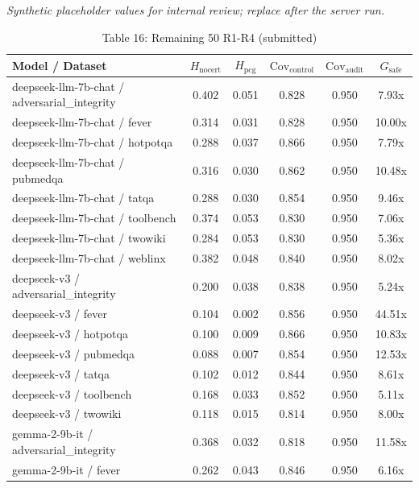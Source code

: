 

\begin{table}[h]
\centering
\small
  \textit{Synthetic placeholder values for internal review; replace after the server run.}
\caption{Table 16: Remaining 50 R1-R4 (submitted)}
\label{tab:appendix_remaining_50_r1r4_old}
\begin{tabular}{l|cc|cc|c}
\hline
Model / Dataset & $H_{\mathrm{nocert}}$ & $H_{\mathrm{pcg}}$ & $\mathrm{Cov}_{\mathrm{control}}$ & $\mathrm{Cov}_{\mathrm{audit}}$ & $G_{\mathrm{safe}}$ \\
\hline
deepseek-llm-7b-chat / adversarial_integrity & 0.402 & 0.051 & 0.828 & 0.950 & 7.93x \\
deepseek-llm-7b-chat / fever & 0.314 & 0.031 & 0.828 & 0.950 & 10.00x \\
deepseek-llm-7b-chat / hotpotqa & 0.288 & 0.037 & 0.866 & 0.950 & 7.79x \\
deepseek-llm-7b-chat / pubmedqa & 0.316 & 0.030 & 0.862 & 0.950 & 10.48x \\
deepseek-llm-7b-chat / tatqa & 0.288 & 0.030 & 0.854 & 0.950 & 9.46x \\
deepseek-llm-7b-chat / toolbench & 0.374 & 0.053 & 0.830 & 0.950 & 7.06x \\
deepseek-llm-7b-chat / twowiki & 0.284 & 0.053 & 0.830 & 0.950 & 5.36x \\
deepseek-llm-7b-chat / weblinx & 0.382 & 0.048 & 0.840 & 0.950 & 8.02x \\
deepseek-v3 / adversarial_integrity & 0.200 & 0.038 & 0.838 & 0.950 & 5.24x \\
deepseek-v3 / fever & 0.104 & 0.002 & 0.856 & 0.950 & 44.51x \\
deepseek-v3 / hotpotqa & 0.100 & 0.009 & 0.866 & 0.950 & 10.83x \\
deepseek-v3 / pubmedqa & 0.088 & 0.007 & 0.854 & 0.950 & 12.53x \\
deepseek-v3 / tatqa & 0.102 & 0.012 & 0.844 & 0.950 & 8.61x \\
deepseek-v3 / toolbench & 0.168 & 0.033 & 0.852 & 0.950 & 5.11x \\
deepseek-v3 / twowiki & 0.118 & 0.015 & 0.814 & 0.950 & 8.00x \\
gemma-2-9b-it / adversarial_integrity & 0.368 & 0.032 & 0.818 & 0.950 & 11.58x \\
gemma-2-9b-it / fever & 0.262 & 0.043 & 0.846 & 0.950 & 6.16x \\

\end{tabular}
\end{table}
